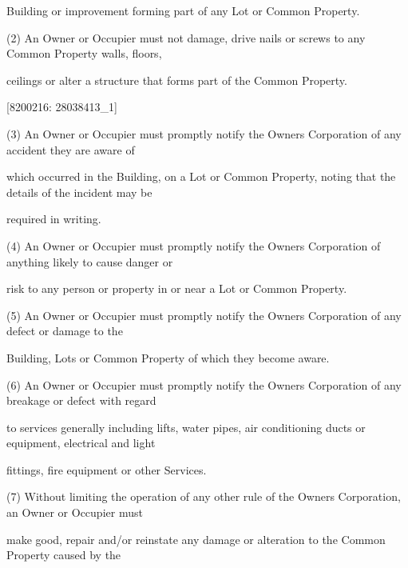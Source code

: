 \documentclass{article}
\begin{document}
{\fontsize{10.02}{1}Building or improvement forming part of any Lot or Common Property. }

{\fontsize{9.962}{1}(2) An Owner or Occupier must not damage, drive nails or screws to any Common Property walls, floors, }

{\fontsize{10.02}{1}ceilings or alter a structure that forms part of the Common Property. }


\newpage
















{\fontsize{7.02}{1}[8200216: 28038413\_1] }

{\fontsize{9.962}{1}(3) An Owner or Occupier must promptly notify the Owners Corporation of any accident they are aware of }

{\fontsize{10.02}{1}which occurred in the Building, on a Lot or Common Property, noting that the details of the incident may be }

{\fontsize{10.02}{1}required in writing. }

{\fontsize{9.962}{1}(4) An Owner or Occupier must promptly notify the Owners Corporation of anything likely to cause danger or }

{\fontsize{10.02}{1}risk to any person or property in or near a Lot or Common Property. }

{\fontsize{9.962}{1}(5) An Owner or Occupier must promptly notify the Owners Corporation of any defect or damage to the }

{\fontsize{10.02}{1}Building, Lots or Common Property of which they become aware. }

{\fontsize{9.962}{1}(6) An Owner or Occupier must promptly notify the Owners Corporation of any breakage or defect with regard }

{\fontsize{10.02}{1}to services generally including lifts, water pipes, air conditioning ducts or equipment, electrical and light }

{\fontsize{10.02}{1}fittings, fire equipment or other Services. }

{\fontsize{9.962}{1}(7) Without limiting the operation of any other rule of the Owners Corporation, an Owner or Occupier must }

{\fontsize{10.02}{1}make good, repair and/or reinstate any damage or alteration to the Common Property caused by the }
\end{document}
